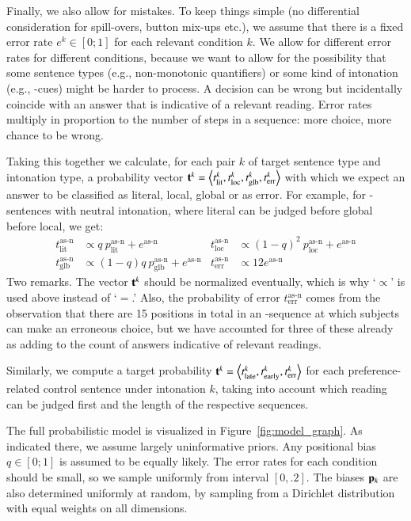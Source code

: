\documentclass[fleqn,reqno,10pt,draft]{article}
\newcommand{\as}{\acro{as}}
\newcommand{\ec}{\acro{ec}}
\begin{document}
Finally, we also allow for mistakes. To keep things simple (no
differential consideration for spill-overs, button mix-ups etc.), we
assume that there is a fixed error rate $e^k \in [0;1]$ for each
relevant condition $k$. We allow for different error rates for
different conditions, because we want to allow for the possibility
that some sentence types (e.g., non-monotonic quantifiers) or some
kind of intonation (e.g., \ec-cues) might be harder to process. A
decision can be wrong but incidentally coincide with an answer that is
indicative of a relevant reading. Error rates multiply in proportion
to the number of steps in a sequence: more choice, more chance to be
wrong.

Taking this together we calculate, for each pair $k$ of target
sentence type and intonation type, a probability vector $\mathbf{t}^k =
\left \langle t^k_{\text{lit}},t^k_{\text{loc}},t^k_{\text{glb}},t^k_{\text{err}}\right\rangle$
with which we expect an answer to be classified as literal, local,
global or as error. For example, for \as-sentences with neutral
intonation, where literal can be judged before global before local, we
get:
\begin{align*}
  t^{\text{as-n}}_{\text{lit}} & \propto q \
  p^\text{as-n}_{\text{lit}} + e^\text{as-n} &   t^{\text{as-n}}_{\text{loc}} & \propto (1-q)^2 \
  p^\text{as-n}_{\text{loc}} + e^\text{as-n} \\
  t^{\text{as-n}}_{\text{glb}} & \propto (1-q)q \
  p^\text{as-n}_{\text{glb}} + e^\text{as-n} &   t^{\text{as-n}}_{\text{err}} &
  \propto 12 e^\text{as-n}
\end{align*}
Two remarks. The vector $\mathbf{t}^k$ should be normalized eventually,
which is why `$\propto$' is used above instead of `$=$.' Also, the
probability of error $t^{\text{as-n}}_{\text{err}}$ comes from the
observation that there are 15 positions in total in an \as-sequence at
which subjects can make an erroneous choice, but we have accounted for
three of these already as adding to the count of answers indicative of
relevant readings.

Similarly, we compute a target probability $\mathbf{t}^k =
\left \langle t^k_{\text{late}},t^k_{\text{early}},t^k_{\text{err}}\right\rangle$ for
each preference-related control sentence under intonation $k$, taking
into account which reading can be judged first and the length of the
respective sequences.

The full probabilistic model is visualized in
Figure~\ref{fig:model_graph}. As indicated there, we assume largely
uninformative priors. Any positional bias $q \in [0;1]$ is assumed to
be equally likely. The error rates for each condition should be small,
so we sample uniformly from interval $[0,.2]$. The biases
$\mathbf{p}_k$ are also determined uniformly at random, by sampling from a
Dirichlet distribution with equal weights on all dimensions.
\end{document}
